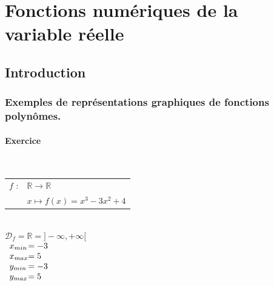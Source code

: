 \ifdefined\COMPLETE
\else
    
    
\fi


\vspace*{-2cm}





\section{Fonctions numériques de la variable réelle}

\subsection{Introduction}

\subsubsection{Exemples de représentations graphiques de fonctions polynômes.}

\paragraph{Exercice }%
~\\
 
\begin{tabular}{l@{$\;$ }l}
$f$ : & $ \mathbb{R} \longrightarrow \mathbb{R}$\\
      & $ x \longmapsto f(x) = x^3 -3x^2 +4$\\
\end{tabular}\\

$\mathscr{D}_f = \mathbb{R} = ] -\infty, +\infty [ $ \\

$
\begin{array}{l@{}l}
          x_{min} &= -3 \\
          x_{max} &= 5  \\
          y_{min} &= -3 \\
          y_{max} &= 5  \\
\end{array}
$

